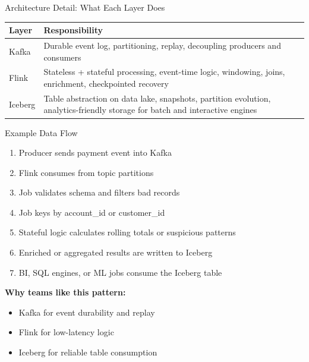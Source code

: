 \documentclass[aspectratio=169]{beamer}
\begin{document}
\begin{frame}{Architecture Detail: What Each Layer Does}
\begin{table}
\centering
\small
\begin{tabular}{>{\raggedright\arraybackslash}p{2.1cm} >{\raggedright\arraybackslash}p{8.2cm}}
\toprule
Layer & Responsibility \\
\midrule
Kafka & Durable event log, partitioning, replay, decoupling producers and consumers \\
Flink & Stateless + stateful processing, event-time logic, windowing, joins, enrichment, checkpointed recovery \\
Iceberg & Table abstraction on data lake, snapshots, partition evolution, analytics-friendly storage for batch and interactive engines \\
\bottomrule
\end{tabular}
\end{table}
\end{frame}

\begin{frame}{Example Data Flow}
\begin{enumerate}
    \item Producer sends payment event into Kafka
    \item Flink consumes from topic partitions
    \item Job validates schema and filters bad records
    \item Job keys by account\_id or customer\_id
    \item Stateful logic calculates rolling totals or suspicious patterns
    \item Enriched or aggregated results are written to Iceberg
    \item BI, SQL engines, or ML jobs consume the Iceberg table
\end{enumerate}

\vspace{0.3cm}
\textbf{Why teams like this pattern:}
\begin{itemize}
    \item Kafka for event durability and replay
    \item Flink for low-latency logic
    \item Iceberg for reliable table consumption
\end{itemize}
\end{frame}
\end{document}
